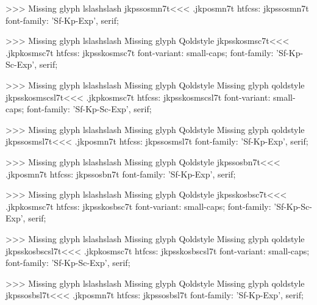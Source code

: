 >>>
Missing glyph	lslashslash
\<jkpssosmn7t\><<<
.jkposmn7t
htfcss:  jkpssosmn7t  font-family: 'Sf-Kp-Exp', serif;

>>>
Missing glyph	lslashslash
Missing glyph	Qoldstyle
\<jkpsskosmsc7t\><<<
.jkpkosmsc7t
htfcss:  jkpsskosmsc7t  font-variant: small-caps; font-family: 'Sf-Kp-Sc-Exp', serif;

>>>
Missing glyph	lslashslash
Missing glyph	Qoldstyle
Missing glyph	qoldstyle
\<jkpsskosmscsl7t\><<<
.jkpkosmsc7t
htfcss:  jkpsskosmscsl7t  font-variant: small-caps; font-family: 'Sf-Kp-Sc-Exp', serif;

>>>
Missing glyph	lslashslash
Missing glyph	Qoldstyle
Missing glyph	qoldstyle
\<jkpssosmsl7t\><<<
.jkposmn7t
htfcss:  jkpssosmsl7t  font-family: 'Sf-Kp-Exp', serif;

>>>
Missing glyph	lslashslash
Missing glyph	Qoldstyle
\<jkpssosbn7t\><<<
.jkposmn7t
htfcss:  jkpssosbn7t  font-family: 'Sf-Kp-Exp', serif;

>>>
Missing glyph	lslashslash
Missing glyph	Qoldstyle
\<jkpsskosbsc7t\><<<
.jkpkosmsc7t
htfcss:  jkpsskosbsc7t  font-variant: small-caps; font-family: 'Sf-Kp-Sc-Exp', serif;

>>>
Missing glyph	lslashslash
Missing glyph	Qoldstyle
Missing glyph	qoldstyle
\<jkpsskosbscsl7t\><<<
.jkpkosmsc7t
htfcss:  jkpsskosbscsl7t  font-variant: small-caps; font-family: 'Sf-Kp-Sc-Exp', serif;

>>>
Missing glyph	lslashslash
Missing glyph	Qoldstyle
Missing glyph	qoldstyle
\<jkpssosbsl7t\><<<
.jkposmn7t
htfcss:  jkpssosbsl7t  font-family: 'Sf-Kp-Exp', serif;

